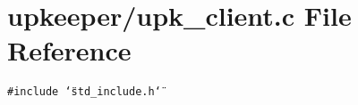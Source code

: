 \section{upkeeper/upk\_\-client.c File Reference}
\label{upk__client_8c}
{\tt \#include \char`\"{}std\_\-include.h\char`\"{}}\par
